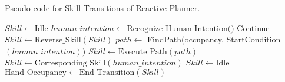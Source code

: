 \begin{algorithm}
\caption{Pseudo-code for Skill Transitions of Reactive Planner.}
\begin{algorithmic}[1]
\label{alg:planner}
\STATE $Skill \gets \text{Idle}$
    \STATE $human\_intention \gets \text{Recognize\_Human\_Intention()}$
            \STATE Continue
        \ENDIF
            \STATE $Skill \gets \text{Reverse\_Skill}(Skill)$
        \ENDIF
             \STATE $path \gets$  FindPath(occupancy, StartCondition $(human\_intention))$
            \STATE $Skill \gets \text{Execute\_Path}(path)$
        \ELSE
            \STATE $Skill \gets \text{Corresponding Skill} (human\_intention)$
        \ENDIF
        \STATE $Skill \gets \text{Idle}$
            \STATE $\text{Hand Occupancy} \gets \text{End\_Transition}(Skill)$
        \ENDIF
    \ENDIF
\ENDWHILE
\end{algorithmic}
\end{algorithm}